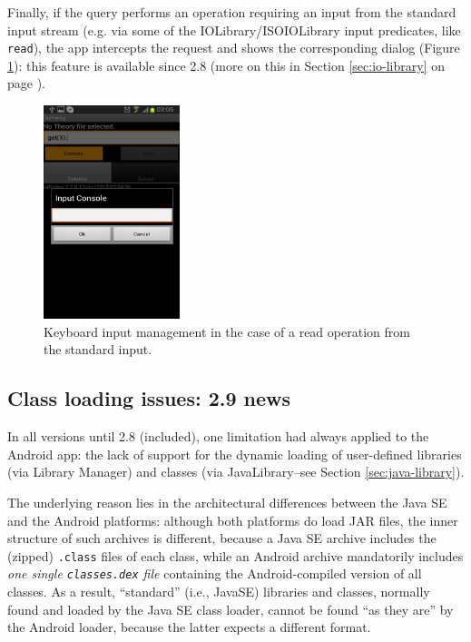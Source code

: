 Finally, if the query performs an operation requiring an input from the standard input stream (e.g. via some of the IOLibrary/ISOIOLibrary input predicates, like \texttt{read}), the app intercepts the request and shows the corresponding dialog (Figure \ref{fig:android9}): this feature is available since \tuprolog{} 2.8 (more on this in Section \ref{sec:io-library} on page \pageref{sec:io-library}).

\begin{figure}
\centering
  \includegraphics[width=150px]{images/android9.png}
  \caption{Keyboard input management in the case of a read operation from the standard input.}\label{fig:android9}
\end{figure}

\subsection{Class loading issues: \tuprolog{} 2.9 news}
\label{ssec:android-classloading-issues}

In all \tuprolog{} versions until 2.8 (included), one limitation had always applied to the Android app: the lack of support for the dynamic loading of user-defined libraries (via Library Manager) and classes (via JavaLibrary--see Section \ref{sec:java-library}).

The underlying reason lies in the architectural differences between the Java SE and the Android platforms: although both platforms do load JAR files, the inner structure of such archives is different, because a Java SE archive includes the (zipped) \texttt{.class} files of each class, while an Android archive mandatorily includes \textit{one single \texttt{classes.dex} file} containing the Android-compiled version of all classes.
As a result, ``standard'' (i.e., JavaSE) libraries and classes, normally found and loaded by the Java SE class loader, cannot be found ``as they are'' by the Android loader, because the latter expects a different format.

